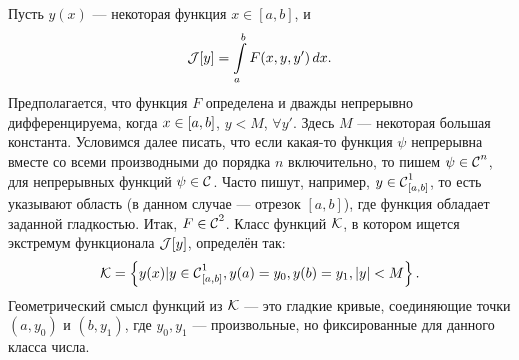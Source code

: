 Пусть $y(x)$ --- некоторая функция $x\in{[a,b]}$, и
\begin{equation*}
	\hfill\J[y]=\int\limits_a^b F(x,y,y')\,dx.\hfill
\end{equation*}
Предполагается, что функция $F$ определена и дважды непрерывно дифференцируема, когда $x\?\in[a,b]$, $y<M$, $\forall y'$. Здесь $M$ --- некоторая большая константа. Условимся далее писать, что если какая-то функция $\psi$ непрерывна вместе со всеми производными до порядка $n$ включительно, то пишем $\psi\in\Cfn[]{n}$, для непрерывных функций $\psi\in\Cfn[]{}$. Часто пишут, например, $y\in\Cfn[{[a,b]}]{1}$, то есть указывают область (в данном случае --- отрезок ${[a,b]}$), где функция обладает заданной гладкостью. Итак, $F\?\in\Cfn[]{2}$. Класс функций $\mc{K}$, в котором ищется экстремум функционала $\J[y]$, определён так:
\begin{equation*}
	\hfill\mc{K}=\left\{y(x)|y\in\Cfn[{[a,b]}]{1}, y(a)=y_0, y(b)=y_1, |y|<M\right\}.\hfill
\end{equation*} 
Геометрический смысл функций из $\mc{K}$ --- это гладкие кривые, соединяющие точки $(a,y_0)$ и $(b, y_1)$, где $y_0, y_1$ --- произвольные, но фиксированные для данного класса числа.


